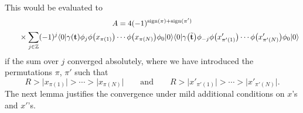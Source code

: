 \documentclass[10pt,a4paper]{amsart}
\numberwithin{equation}{section}
\begin{document}
This would be evaluated to
\begin{gather}
A = 4 (-1)^{\mathrm{sign}(\pi)+\mathrm{sign}(\pi')}\label{pre-Hirotabis}
\\ \hphantom{A =}{}
 \times\sum_{j\in \mathbb{Z}}(-1)^j
\langle 0|\gamma(\mathbf{t}) \phi_j \phi\bigl(x_{\pi(1)}\bigr)\cdots \phi\bigl(x_{\pi(N)}\bigr)
\phi_0|0\rangle
\langle 0|\gamma\bigl(\tilde{\mathbf{t}}\bigr) \phi_{-j} \phi\bigl(x_{\pi'(1)}'\bigr)\cdots \phi\bigl(x_{\pi'(N)}'\bigr)
\phi_0|0\rangle\nonumber
\end{gather}
if the sum over $j$ converged absolutely, where we have introduced the permutations $\pi$, $\pi'$ such that
\[
R>\bigl|x_{\pi(1)}\bigr|>\cdots >\bigl|x_{\pi(N)}\bigr| \qquad \text{and} \qquad R>\bigl|x'_{\pi'(1)}\bigr|>\cdots >\bigl|x'_{\pi'(N)}\bigr|.
\]
The next lemma justifies the convergence under mild additional conditions on $x$'s and $x'$'s.
\end{document}
